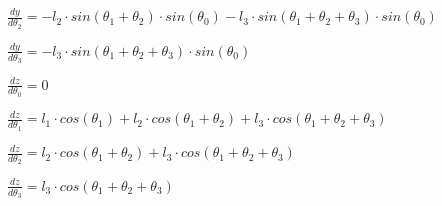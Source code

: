 $\frac{dy}{d\theta_2} = -l_2 \cdot sin(\theta_1 + \theta_2) \cdot sin(\theta_0) -l_3\cdot  sin(\theta_1 + \theta_2 + \theta_3 ) \cdot sin(\theta_0)$

$\frac{dy}{d\theta_3} =-l_3\cdot  sin(\theta_1 + \theta_2 + \theta_3 ) \cdot sin(\theta_0)$

$\frac{dz}{d\theta_0} = 0 $

$\frac{dz}{d\theta_1} = l_1 \cdot cos(\theta_1) + l_2 \cdot cos(\theta_1 + \theta_2) + l_3 \cdot cos(\theta_1 + \theta_2 + \theta_3) $

$\frac{dz}{d\theta_2} = l_2 \cdot cos(\theta_1 + \theta_2) + l_3 \cdot cos(\theta_1 + \theta_2 + \theta_3) $

$\frac{dz}{d\theta_3} = l_3 \cdot cos(\theta_1 + \theta_2 + \theta_3) $